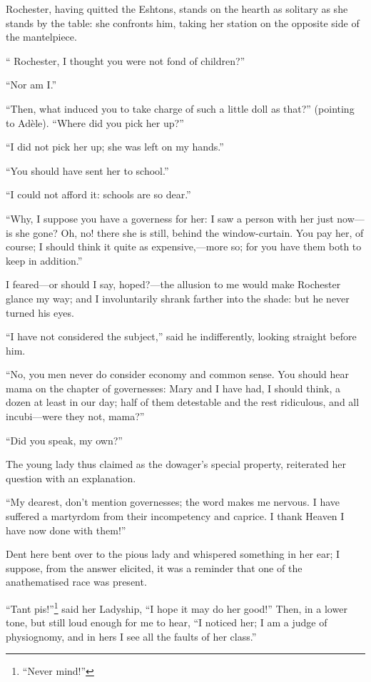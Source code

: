 \Mr{} Rochester, having quitted the Eshtons, stands on the hearth as
solitary as she stands by the table: she confronts him, taking her
station on the opposite side of the mantelpiece.

\enquote{\Mr{} Rochester, I thought you were not fond of children?}

\enquote{Nor am I\@.}

\enquote{Then, what induced you to take charge of such a little doll as
	that?} (pointing to Adèle). \enquote{Where did you pick her up?}

\enquote{I did not pick her up; she was left on my hands.}

\enquote{You should have sent her to school.}

\enquote{I could not afford it: schools are so dear.}

\enquote{Why, I suppose you have a governess for her: I saw a person
	with her just now---is she gone? Oh, no! there she is still, behind the
	window-curtain. You pay her, of course; I should think it quite as
	expensive,---more so; for you have them both to keep in addition.}

I feared---or should I say, hoped?---the allusion to me would make \Mr{}
Rochester glance my way; and I involuntarily shrank farther into the
shade: but he never turned his eyes.

\enquote{I have not considered the subject,} said he indifferently,
looking straight before him.

\enquote{No, you men never do consider economy and common sense. You
	should hear mama on the chapter of governesses: Mary and I have had, I
	should think, a dozen at least in our day; half of them detestable and
	the rest ridiculous, and all incubi---were they not, mama?}

\enquote{Did you speak, my own?}

The young lady thus claimed as the dowager's special property,
reiterated her question with an explanation.

\enquote{My dearest, don't mention governesses; the word makes me
	nervous. I have suffered a martyrdom from their incompetency and
	caprice. I thank Heaven I have now done with them!}

\Mrs{} Dent here bent over to the pious lady and whispered something in
her ear; I suppose, from the answer elicited, it was a reminder that one
of the anathematised race was present.

\foreignquote{french}{Tant pis!}\footnote{\enquote{Never mind!}} said her Ladyship, \enquote{I hope it may do her
	good!} Then, in a lower tone, but still loud enough for me to hear,
\enquote{I noticed her; I am a judge of physiognomy, and in hers I see
	all the faults of her class.}

